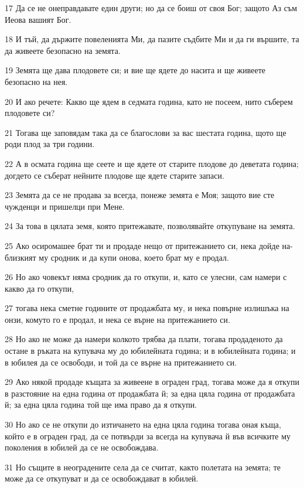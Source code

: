 \par 17 Да се не онеправдавате един други; но да се боиш от своя Бог; защото Аз съм Иеова вашият Бог.
\par 18 И тъй, да държите повеленията Ми, да пазите съдбите Ми и да ги вършите, та да живеете безопасно на земята.
\par 19 Земята ще дава плодовете си; и вие ще ядете до насита и ще живеете безопасно на нея.
\par 20 И ако речете: Какво ще ядем в седмата година, като не посеем, нито съберем плодовете си?
\par 21 Тогава ще заповядам така да се благослови за вас шестата година, щото ще роди плод за три години.
\par 22 А в осмата година ще сеете и ще ядете от старите плодове до деветата година; догдето се съберат нейните плодове ще ядете старите запаси.
\par 23 Земята да се не продава за всегда, понеже земята е Моя; защото вие сте чужденци и пришелци при Мене.
\par 24 За това в цялата земя, която притежавате, позволявайте откупуване на земята.
\par 25 Ако осиромашее брат ти и продаде нещо от притежанието си, нека дойде на-близкият му сродник и да купи онова, което брат му е продал.
\par 26 Но ако човекът няма сродник да го откупи, и, като се улесни, сам намери с какво да го откупи,
\par 27 тогава нека сметне годините от продажбата му, и нека повърне излишъка на онзи, комуто го е продал, и нека се върне на притежанието си.
\par 28 Но ако не може да намери колкото трябва да плати, тогава продаденото да остане в ръката на купувача му до юбилейната година; и в юбилейната година; и в юбилея да се освободи, и той да се върне на притежанието си.
\par 29 Ако някой продаде къщата за живеене в ограден град, тогава може да я откупи в разстояние на една година от продажбата й; за една цяла година от продажбата й; за една цяла година той ще има право да я откупи.
\par 30 Но ако се не откупи до изтичането на една цяла година тогава оная къща, който е в ограден град, да се потвърди за всегда на купувача й във всичките му поколения в юбилей да се не освобождава.
\par 31 Но същите в неоградените села да се считат, както полетата на земята; те може да се откупуват и да се освобождават в юбилей.
